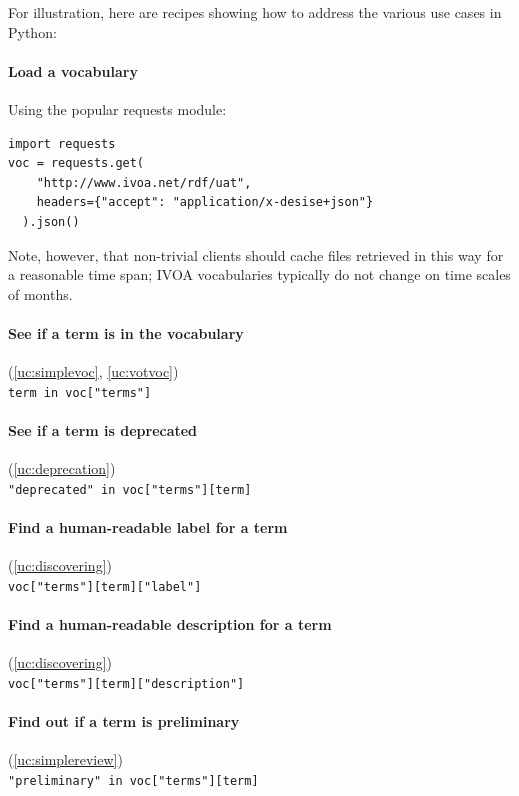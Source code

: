 \documentclass[11pt,a4paper]{ivoa}
\begin{document}
For illustration, here are recipes showing how to address 
the various use cases in Python:

\paragraph{Load a vocabulary} Using the popular requests module:\\
\begin{lstlisting}
import requests
voc = requests.get(
    "http://www.ivoa.net/rdf/uat", 
    headers={"accept": "application/x-desise+json"}
  ).json()
\end{lstlisting}

Note, however, that non-trivial clients should cache files retrieved in
this way for a reasonable time span; IVOA vocabularies typically do not
change on time scales of months.

\paragraph{See if a term is in the vocabulary} (\ref{uc:simplevoc},
\ref{uc:votvoc})\\ \lstinline{term in voc["terms"]}

\paragraph{See if a term is deprecated} (\ref{uc:deprecation})\\
\lstinline{"deprecated" in voc["terms"][term]}

\paragraph{Find a human-readable label for a term}
(\ref{uc:discovering})\\
\lstinline{voc["terms"][term]["label"]}

\paragraph{Find a human-readable description for a term}
(\ref{uc:discovering})\\
\lstinline{voc["terms"][term]["description"]}

\paragraph{Find out if a term is preliminary} (\ref{uc:simplereview})\\
\lstinline{"preliminary" in voc["terms"][term]}
\end{document}

